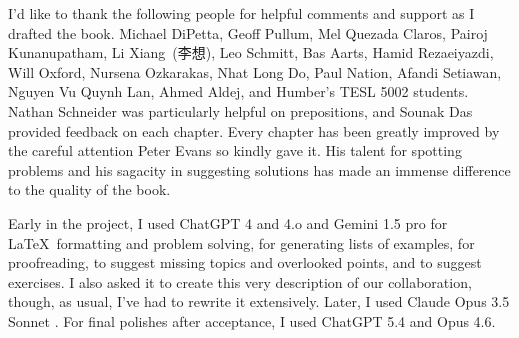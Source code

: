 \addchap{\lsAcknowledgementTitle} 

I'd like to thank the following people for helpful comments and support as I drafted the book. Michael DiPetta, Geoff Pullum, Mel Quezada Claros, Pairoj Kunanupatham, Li Xiang~\mbox{(李想)}, Leo Schmitt, Bas Aarts, Hamid Rezaeiyazdi, Will Oxford, Nursena Ozkarakas, Nhat Long Do, Paul Nation, Afandi Setiawan, Nguyen Vu Quynh Lan, Ahmed Aldej, and Humber's TESL 5002 students. Nathan Schneider was particularly helpful on prepositions, and Sounak Das provided feedback on each chapter. Every chapter has been greatly improved by the careful attention Peter Evans so kindly gave it. His talent for spotting problems and his sagacity in suggesting solutions has made an immense difference to the quality of the book.

Early in the project, I used ChatGPT 4 and 4.o \citep{openai2023gpt4} and Gemini 1.5 pro \citep{deepmind2023gemini} for \LaTeX ~formatting and problem solving, for generating lists of examples, for proofreading, to suggest missing topics and overlooked points, and to suggest exercises. I also asked it to create this very description of our collaboration, though, as usual, I've had to rewrite it extensively. Later, I used Claude Opus 3.5 Sonnet \citep{Anthropic2024}. For final polishes after acceptance, I used ChatGPT 5.4 and Opus 4.6.
